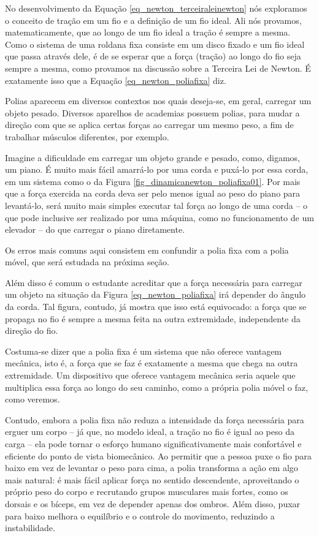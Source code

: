 No desenvolvimento da Equação \eqref{eq_newton_terceiraleinewton} nós exploramos o conceito de tração em um fio e a definição de um fio ideal. Ali nós provamos, matematicamente, que ao longo de um fio ideal a tração é sempre a mesma. Como o sistema de uma roldana fixa consiste em um disco fixado e um fio ideal que passa através dele, é de se esperar que a força (tração) ao longo do fio seja sempre a mesma, como provamos na discussão sobre a Terceira Lei de Newton. É exatamente isso que a Equação \eqref{eq_newton_poliafixa} diz.


Polias aparecem em diversos contextos nos quais deseja-se, em geral, carregar um objeto pesado. Diversos aparelhos de academias possuem polias, para mudar a direção com que se aplica certas forças ao carregar um mesmo peso, a fim de trabalhar músculos diferentes, por exemplo.

Imagine a dificuldade em carregar um objeto grande e pesado, como, digamos, um piano. É muito mais fácil amarrá-lo por uma corda e puxá-lo por essa corda, em um sistema como o da Figura \ref{fig_dinamicanewton_poliafixa01}. Por mais que a força exercida na corda deva ser pelo menos igual ao peso do piano para levantá-lo, será muito mais simples executar tal força ao longo de uma corda -- o que pode inclusive ser realizado por uma máquina, como no funcionamento de um elevador -- do que carregar o piano diretamente. 


Os erros mais comuns aqui consistem em confundir a polia fixa com a polia móvel, que será estudada na próxima seção. 

Além disso é comum o estudante acreditar que a força necessária para carregar um objeto na situação da Figura \ref{eq_newton_poliafixa} irá depender do ângulo da corda. Tal figura, contudo, já mostra que isso está equivocado: a força que se propaga no fio é sempre a mesma feita na outra extremidade, independente da direção do fio.



Costuma-se dizer que a polia fixa é um sistema que não oferece vantagem mecânica, isto é, a força que se faz é exatamente a mesma que chega na outra extremidade. Um dispositivo que oferece vantagem mecânica seria aquele que multiplica essa força ao longo do seu caminho, como a própria polia móvel o faz, como veremos.

Contudo, embora a polia fixa não reduza a intensidade da força necessária para erguer um corpo -- já que, no modelo ideal, a tração no fio é igual ao peso da carga -- ela pode tornar o esforço humano significativamente mais confortável e eficiente do ponto de vista biomecânico. Ao permitir que a pessoa puxe o fio para baixo em vez de levantar o peso para cima, a polia transforma a ação em algo mais natural: é mais fácil aplicar força no sentido descendente, aproveitando o próprio peso do corpo e recrutando grupos musculares mais fortes, como os dorsais e os bíceps, em vez de depender apenas dos ombros. Além disso, puxar para baixo melhora o equilíbrio e o controle do movimento, reduzindo a instabilidade. 

